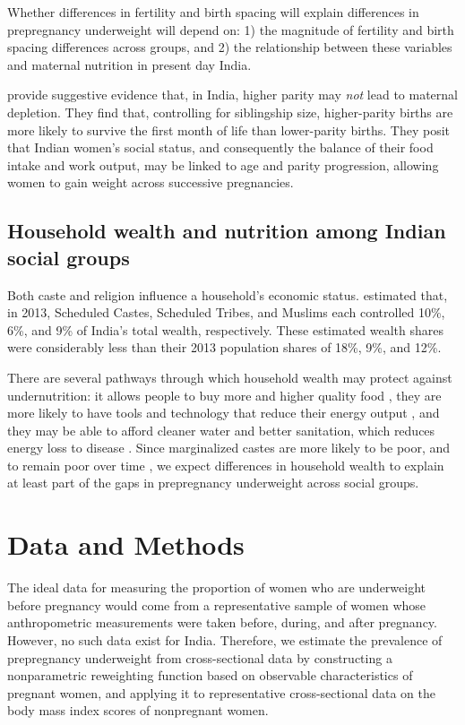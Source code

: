 \documentclass[12pt]{article}
\begin{document}
Whether differences in fertility and birth spacing will explain differences in prepregnancy underweight will depend on: 1) the magnitude of fertility and birth spacing differences across groups, and 2) the relationship between these variables and maternal nutrition in present day India. 

\cite{coffey2021neonatal} provide suggestive evidence that, in India, higher parity may \emph{not} lead to maternal depletion.  They find that, controlling for siblingship size, higher-parity births are more likely to survive the first month of life than lower-parity births.  They posit that Indian women's social status, and consequently the balance of their food intake and work output, may be linked to age and parity progression, allowing women to gain weight across successive pregnancies. 

\subsection{Household wealth and nutrition among Indian social groups}

Both caste and religion influence a household's economic status.  \cite{tagade2020intergroup} estimated that, in 2013, Scheduled Castes, Scheduled Tribes, and Muslims each controlled 10\%, 6\%, and 9\% of India's total wealth, respectively.  These estimated wealth shares were considerably less than their 2013 population shares of 18\%, 9\%, and 12\%.  

There are several pathways through which household wealth may protect against undernutrition: it allows people to buy more and higher quality food \citep{raghunathan2021affordability}, they are more likely to have tools and technology that reduce their energy output \citep{deaton2009food}, and they may be able to afford cleaner water and better sanitation, which reduces energy loss to disease \citep{bhutta2008works}.  Since marginalized castes are more likely to be poor, and to remain poor over time \citep{thorat2012has, thorat2017escaping}, we expect differences in household wealth to explain at least part of the gaps in prepregnancy underweight across  social groups. 

\section{Data and Methods}
 
The ideal data for measuring the proportion of women who are underweight before pregnancy would come from a representative sample of women whose anthropometric measurements were taken before, during, and after pregnancy.  However, no such data exist for India.  Therefore, we estimate the prevalence of prepregnancy underweight from cross-sectional data by constructing a nonparametric reweighting function based on observable characteristics of pregnant women, and applying it to representative cross-sectional data on the body mass index scores of nonpregnant women.  
\end{document}
